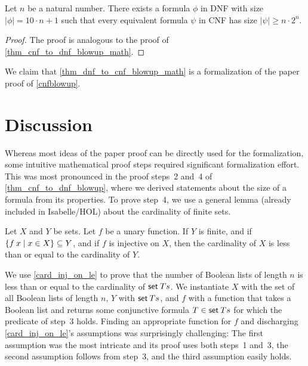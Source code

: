 \documentclass[a4paper,USenglish,cleveref, autoref, thm-restate]{lipics-v2021}
\theoremstyle{definition}
\begin{document}
\begin{theorem}
  \label{thm_dnf_to_cnf_blowup_math}
  Let $n$ be a natural number.
  There exists a formula $\phi$ in DNF with size $\left|\phi\right| = 10 \cdot n + 1$ such that every equivalent formula $\psi$ in CNF has size $\left|\psi\right| \ge n \cdot 2^n$.
\end{theorem}
\begin{proof}
  The proof is analogous to the proof of \cref{thm_cnf_to_dnf_blowup_math}.
\end{proof}

We claim that \cref{thm_dnf_to_cnf_blowup_math} is a formalization of the paper proof of \cref{cnfblowup}.

\section{Discussion}
\label{sec_discussion}

Whereas most ideas of the paper proof can be directly used for the formalization, some intuitive mathematical proof steps required significant formalization effort.
This was most pronounced in the proof steps~2 and~4 of \cref{thm_cnf_to_dnf_blowup}, where we derived statements about the size of a formula from its properties.
To prove step~4, we use a general lemma (already included in Isabelle/HOL) about the cardinality of finite sets.

\begin{lemma}
  \label{card_inj_on_le}
  Let $X$ and $Y$ be sets. Let $f$ be a unary function.
  If $Y$ is finite, and
  if $\setImage{x}{f}{X} \subseteq Y$, and
  if $f$ is injective on $X$,
  then the cardinality of $X$ is less than or equal to the cardinality of $Y$.
\end{lemma}

We use \cref{card_inj_on_le} to prove that the number of Boolean lists of length $n$ is less than or equal to the cardinality of $\isaAp{\cst{set}}{Ts}$.
We instantiate $X$ with the set of all Boolean lists of length $n$,
$Y$ with $\isaAp{\cst{set}}{Ts}$, and
$f$ with a function that takes a Boolean list and returns some conjunctive formula $T \in \isaAp{\cst{set}}{Ts}$ for which the predicate of step~3 holds.
Finding an appropriate function for $f$ and discharging \cref{card_inj_on_le}'s assumptions was surprisingly challenging:
The first assumption was the most intricate and its proof uses both steps~1 and~3,
the second assumption follows from step~3, and
the third assumption easily holds.
\end{document}
